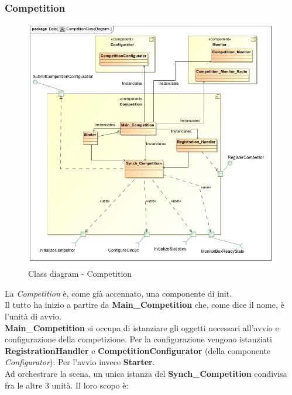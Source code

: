 \subsubsection{Competition}
\begin{center}
\begin{figure}[h!]
	\includegraphics[scale=0.50]{img/ClassDiagrams/CompetitionClassDiagram.jpg}
\caption{Class diagram - Competition}
\end{figure}
\end{center}
La \emph{Competition} \`{e}, come gi\`{a} accennato, una componente di init.\\
Il tutto ha inizio a partire da \textbf{Main\_Competition} che, come dice il nome, \`{e} l'unit\`{a} di avvio.\\
\textbf{Main\_Competition} si occupa di istanziare gli oggetti necessari all'avvio e configurazione della competizione. Per la configurazione
vengono istanziati \textbf{RegistrationHandler} e \textbf{CompetitionConfigurator} (della componente \emph{Configurator}).
Per l'avvio invece \textbf{Starter}. \\
Ad orchestrare la scena, un unica istanza del \textbf{Synch\_Competition} condivisa fra le altre 3 unit\`{a}. Il loro scopo \`{e}:
